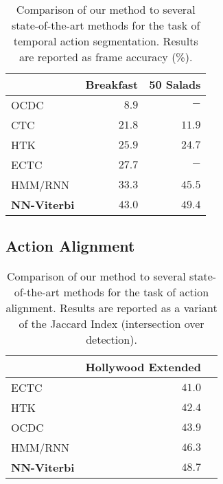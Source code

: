 \documentclass[10pt,twocolumn,letterpaper]{article}
\begin{document}
\begin{table}
    \footnotesize
    \begin{tabularx}{0.48\textwidth}{Xrr}
        \toprule
                                            & \textbf{Breakfast} & \textbf{50 Salads} \\
        \midrule
        OCDC \cite{bojanowski14weakly}      & $ 8.9 $            & $ - $              \\
        CTC  \cite{huang2016connectionist}  & $ 21.8 $           & $ 11.9 $           \\
        HTK  \cite{kuehne16end}             & $ 25.9 $           & $ 24.7 $           \\
        ECTC \cite{huang2016connectionist}  & $ 27.7 $           & $ - $              \\
        HMM/RNN \cite{richard2017weakly}    & $ 33.3 $           & $ 45.5 $           \\
        \midrule
        \textbf{NN-Viterbi}            & $ \mathbf{43.0} $  & $ \mathbf{49.4} $  \\
        \bottomrule
    \end{tabularx}
    \caption{Comparison of our method to several state-of-the-art methods for the task of
             temporal action segmentation. Results are reported as frame accuracy (\%).}
    \label{tab:actionSegmentation}
\end{table}


\subsection{Action Alignment}
\label{sec:actionAlignment}

\begin{table}
    \footnotesize
    \begin{tabularx}{0.48\textwidth}{Xrr}
        \toprule
                                            & \textbf{Hollywood Extended} \\
        \midrule
        ECTC \cite{huang2016connectionist}  & $ 41.0 $ \\
        HTK \cite{kuehne16end}              & $ 42.4 $ \\
        OCDC \cite{bojanowski14weakly}      & $ 43.9 $ \\
        HMM/RNN \cite{richard2017weakly}    & $ 46.3 $ \\
        \midrule
        \textbf{NN-Viterbi}              & $ \mathbf{48.7} $ \\
        \bottomrule
    \end{tabularx}
    \caption{Comparison of our method to several state-of-the-art methods
             for the task of action alignment. Results are reported as a
             variant of the Jaccard Index (intersection over detection).}
    \label{tab:actionAlignment}
    \vspace{-0.3cm}
\end{table}
\end{document}

